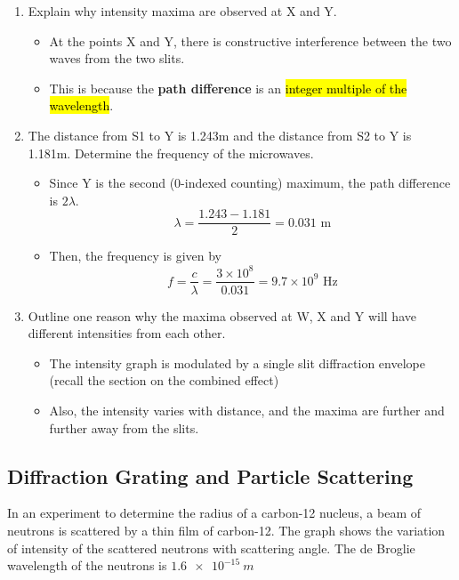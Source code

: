 \documentclass[a4paper,12pt]{article}
\begin{document}
\begin{enumerate}[label=(\alph*)]
  \item Explain why intensity maxima are observed at X and Y.
        \begin{itemize}
          \item At the points X and Y, there is constructive interference between the two waves from the two slits.
          \item This is because the \textbf{path difference} is an \hl{integer multiple of the wavelength}.
        \end{itemize}
  \item The distance from S1 to Y is 1.243m and the distance from S2 to Y is 1.181m. Determine the frequency of the microwaves.
        \begin{itemize}
          \item Since Y is the second (0-indexed counting) maximum, the path difference is $2\lambda$.
                $$\lambda = \frac{1.243 - 1.181}{2} = 0.031 \text{ m}$$
          \item Then, the frequency is given by
                $$f = \frac{c}{\lambda} = \frac{3 \times 10^8}{0.031} = 9.7 \times 10^9 \text{ Hz}$$
        \end{itemize}
  \item Outline one reason why the maxima observed at W, X and Y will have different intensities from each other.
        \begin{itemize}
          \item The intensity graph is modulated by a single slit diffraction envelope (recall the section on the combined effect)
          \item Also, the intensity varies with distance, and the maxima are further and further away from the slits.
        \end{itemize}
\end{enumerate}

\pagebreak

\subsection{Diffraction Grating and Particle Scattering}

In an experiment to determine the radius of a carbon-12 nucleus, a beam of neutrons is scattered by a thin film of carbon-12. The graph shows the variation of intensity of the scattered neutrons with scattering angle. The de Broglie wavelength of the neutrons is $\SI{1.6e-15}{m}$
\end{document}
